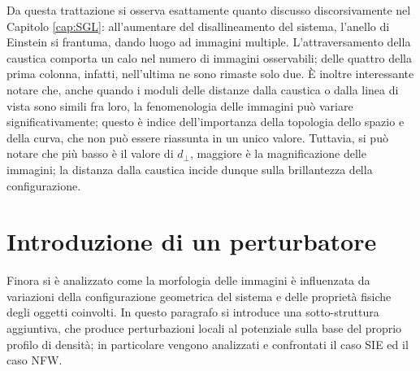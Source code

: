 Da questa trattazione si osserva esattamente quanto discusso discorsivamente nel Capitolo \ref{cap:SGL}: all'aumentare del disallineamento del sistema, l'anello di Einstein si frantuma, dando luogo ad immagini multiple. L'attraversamento della caustica comporta un calo nel numero di immagini osservabili; delle quattro della prima colonna, infatti, nell'ultima ne sono rimaste solo due.  È inoltre interessante notare che, anche quando i moduli delle distanze dalla caustica o dalla linea di vista sono simili fra loro, la fenomenologia delle immagini può variare significativamente; questo è indice dell'importanza della topologia dello spazio e della curva, che non può essere riassunta in un unico valore. Tuttavia, si può notare che più basso è il valore di $d_\perp$, maggiore è la magnificazione delle immagini; la distanza dalla caustica incide dunque sulla brillantezza della configurazione.

\section{Introduzione di un perturbatore}
Finora si è analizzato come la morfologia delle immagini è influenzata da variazioni della configurazione geometrica del sistema e delle proprietà fisiche degli oggetti coinvolti. In questo paragrafo si introduce una sotto-struttura aggiuntiva, che produce perturbazioni locali al potenziale sulla base del proprio profilo di densità; in particolare vengono analizzati e confrontati il caso SIE ed il caso NFW. 
